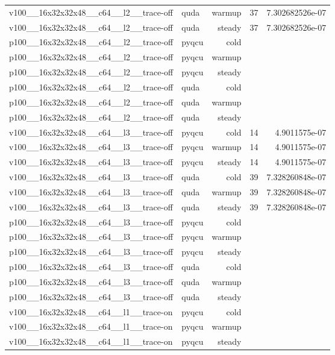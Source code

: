 \begin{table}[htbp]
\begin{tabular}{@{}llrrr@{}}
v100\_\_16x32x32x48\_\_c64\_\_l2\_\_trace-off & quda & warmup & 37 & 7.302682526e-07 \\
v100\_\_16x32x32x48\_\_c64\_\_l2\_\_trace-off & quda & steady & 37 & 7.302682526e-07 \\
p100\_\_16x32x32x48\_\_c64\_\_l2\_\_trace-off & pyqcu & cold &  &  \\
p100\_\_16x32x32x48\_\_c64\_\_l2\_\_trace-off & pyqcu & warmup &  &  \\
p100\_\_16x32x32x48\_\_c64\_\_l2\_\_trace-off & pyqcu & steady &  &  \\
p100\_\_16x32x32x48\_\_c64\_\_l2\_\_trace-off & quda & cold &  &  \\
p100\_\_16x32x32x48\_\_c64\_\_l2\_\_trace-off & quda & warmup &  &  \\
p100\_\_16x32x32x48\_\_c64\_\_l2\_\_trace-off & quda & steady &  &  \\
v100\_\_16x32x32x48\_\_c64\_\_l3\_\_trace-off & pyqcu & cold & 14 & 4.9011575e-07 \\
v100\_\_16x32x32x48\_\_c64\_\_l3\_\_trace-off & pyqcu & warmup & 14 & 4.9011575e-07 \\
v100\_\_16x32x32x48\_\_c64\_\_l3\_\_trace-off & pyqcu & steady & 14 & 4.9011575e-07 \\
v100\_\_16x32x32x48\_\_c64\_\_l3\_\_trace-off & quda & cold & 39 & 7.328260848e-07 \\
v100\_\_16x32x32x48\_\_c64\_\_l3\_\_trace-off & quda & warmup & 39 & 7.328260848e-07 \\
v100\_\_16x32x32x48\_\_c64\_\_l3\_\_trace-off & quda & steady & 39 & 7.328260848e-07 \\
p100\_\_16x32x32x48\_\_c64\_\_l3\_\_trace-off & pyqcu & cold &  &  \\
p100\_\_16x32x32x48\_\_c64\_\_l3\_\_trace-off & pyqcu & warmup &  &  \\
p100\_\_16x32x32x48\_\_c64\_\_l3\_\_trace-off & pyqcu & steady &  &  \\
p100\_\_16x32x32x48\_\_c64\_\_l3\_\_trace-off & quda & cold &  &  \\
p100\_\_16x32x32x48\_\_c64\_\_l3\_\_trace-off & quda & warmup &  &  \\
p100\_\_16x32x32x48\_\_c64\_\_l3\_\_trace-off & quda & steady &  &  \\
v100\_\_16x32x32x48\_\_c64\_\_l1\_\_trace-on & pyqcu & cold &  &  \\
v100\_\_16x32x32x48\_\_c64\_\_l1\_\_trace-on & pyqcu & warmup &  &  \\
v100\_\_16x32x32x48\_\_c64\_\_l1\_\_trace-on & pyqcu & steady &  &  \\

\end{tabular}
\end{table}
